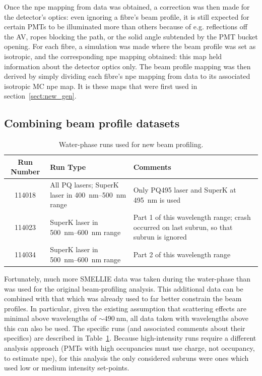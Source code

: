 Once the npe mapping from data was obtained, a correction was then made for the detector's optics: even ignoring a fibre's beam profile, it is still expected for certain PMTs to be illuminated more than others because of e.g. reflections off the AV, ropes blocking the path, or the solid angle subtended by the PMT bucket opening. For each fibre, a simulation was made where the beam profile was set as isotropic, and the corresponding npe mapping obtained: this map held information about the detector optics only. The beam profile mapping was then derived by simply dividing each fibre's npe mapping from data to its associated isotropic MC npe map. It is these maps that were first used in section~\ref{sect:new_gen}.

\subsection{Combining beam profile datasets}\label{sec:combining_beam_profiles}
    \begin{table}
        \begin{tabular}{c p{5cm} p{5.5cm}}
            \hline
            Run Number & Run Type & Comments \\ \hline \hline
            \num{114018} & All PQ lasers; SuperK laser in \SIrange{400}{500}{\nano\metre} range & Only PQ495 laser and SuperK at \SI{495}{\nano\metre} is used \\
            \num{114023} & SuperK laser in \SIrange{500}{600}{\nano\metre} range & Part 1 of this wavelength range; crash occurred on last subrun, so that subrun is ignored \\
            \num{114034} & SuperK laser in \SIrange{500}{600}{\nano\metre} range & Part 2 of this wavelength range \\
            \hline
        \end{tabular}
        \caption{Water-phase runs used for new beam profiling.}
        \label{tab:runs_used}
    \end{table}
Fortunately, much more SMELLIE data was taken during the water-phase than was used for the original beam-profiling analysis. This additional data can be combined with that which was already used to far better constrain the beam profiles. In particular, given the existing assumption that scattering effects are minimal above wavelengths of $\sim\SI{490}{\nano\metre}$, all data taken with wavelengths above this can also be used. The specific runs (and associated comments about their specifics) are described in Table~\ref{tab:runs_used}. Because high-intensity runs require a different analysis approach (PMTs with high occupancies must use charge, not occupancy, to  estimate npe), for this analysis the only considered subruns were ones which used low or medium intensity set-points.

